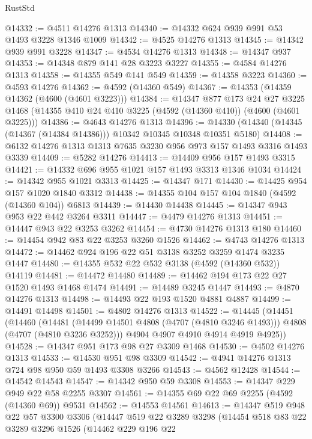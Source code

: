 \begin{lexlean}{RustStd}
\begin{coremodule}
@14332 := @4511 @14276 @1313
@14340 := @14332 @624 @939 @991 @53 @1493 @3228 @1346 @1009
@14342 := @4525 @14276 @1313
@14345 := @14342 @939 @991 @3228
@14347 := @4534 @14276 @1313
@14348 := @14347 @937
@14353 := @14348 @879 @141 @28 @3223 @3227
@14355 := @4584 @14276 @1313
@14358 := @14355 @549 @141 @549
@14359 := @14358 @3223
@14360 := @4593 @14276
@14362 := @4592 (@14360 @549)
@14367 := @14353 (@14359 @14362 (@4600 (@4601 @3223)))
@14384 := @14347
    @877
    @173
    @24
    @27
    @3225
    @1468
    (@14355 @410 @24 @410 @3225 (@4592 (@14360 @410)) (@4600 (@4601 @3225)))
@14386 := @4643 @14276 @1313
@14396 := @14330 (@14340 (@14345 (@14367 (@14384 @14386))) @10342 @10345 @10348 @10351 @5180)
@14408 := @6132 @14276 @1313 @1313 @7635 @3230 @956 @973 @157 @1493 @3316 @1493 @3339
@14409 := @5282 @14276
@14413 := @14409 @956 @157 @1493 @3315
@14421 := @14332 @696 @955 @1021 @157 @1493 @3313 @1346 @1034
@14424 := @14342 @955 @1021 @3313
@14425 := @14347 @171
@14430 := @14425 @954 @157 @1020 @1840 @3312
@14438 := @14355 @104 @157 @104 @1840 (@4592 (@14360 @104)) @6813
@14439 := @14430 @14438
@14445 := @14347 @943 @953 @22 @442 @3264 @3311
@14447 := @4479 @14276 @1313
@14451 := @14447 @943 @22 @3253 @3262
@14454 := @4730 @14276 @1313 @180
@14460 := @14454 @942 @83 @22 @3253 @3260 @1526
@14462 := @4743 @14276 @1313
@14472 := @14462 @924 @196 @22 @51 @3138 @3252 @3259 @1474 @3235 @1447
@14480 := @14355 @532 @22 @532 @3138 (@4592 (@14360 @532)) @14119
@14481 := @14472 @14480
@14489 := @14462 @194 @173 @22 @27 @1520 @1493 @1468 @1474
@14491 := @14489 @3245 @1447
@14493 := @4870 @14276 @1313
@14498 := @14493 @22 @193 @1520 @4881 @4887
@14499 := @14491 @14498
@14501 := @4802 @14276 @1313
@14522 := @14445
    (@14451
      (@14460
        (@14481 (@14499 @14501 @4808 (@4707 (@4810 @3246 @1493))) @4808 (@4707 (@4810 @3236 @3252)))
        @4904
        @4907
        @4910
        @4914
        @4919
        @4925))
@14528 := @14347 @951 @173 @98 @27 @3309 @1468
@14530 := @4502 @14276 @1313
@14533 := @14530 @951 @98 @3309
@14542 := @4941 @14276 @1313 @724 @98 @950 @59 @1493 @3308 @3266
@14543 := @4562 @12428
@14544 := @14542 @14543
@14547 := @14342 @950 @59 @3308
@14553 := @14347 @229 @949 @22 @58 @2255 @3307
@14561 := @14355 @69 @22 @69 @2255 (@4592 (@14360 @69)) @9531
@14562 := @14553 @14561
@14613 := @14347
    @519
    @948
    @22
    @57
    @3300
    @3306
    (@14447
      @519
      @22
      @3289
      @3298
      (@14454
        @518
        @83
        @22
        @3289
        @3296
        @1526
        (@14462
          @229
          @196
          @22

\end{coremodule}
\end{lexlean}
